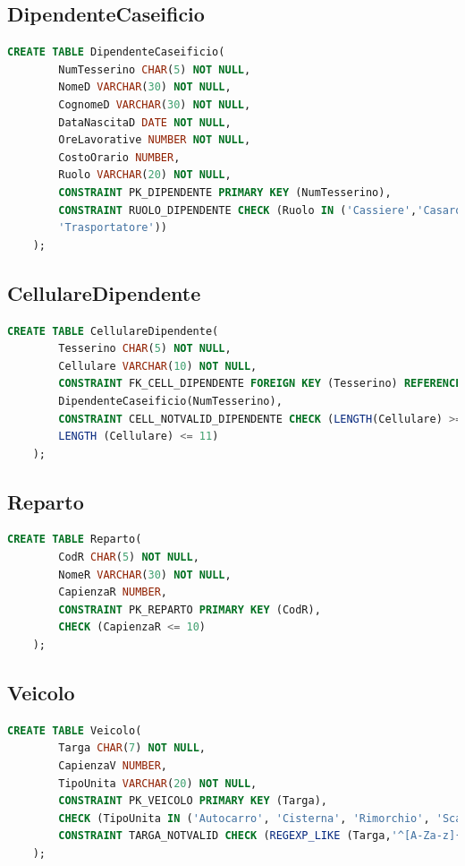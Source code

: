 \documentclass[12pt]{report}
\begin{document}
\subsection*{DipendenteCaseificio}
\begin{lstlisting}[language=SQL]
    CREATE TABLE DipendenteCaseificio(
        NumTesserino CHAR(5) NOT NULL,
        NomeD VARCHAR(30) NOT NULL,
        CognomeD VARCHAR(30) NOT NULL,
        DataNascitaD DATE NOT NULL,
        OreLavorative NUMBER NOT NULL,
        CostoOrario NUMBER,
        Ruolo VARCHAR(20) NOT NULL,
        CONSTRAINT PK_DIPENDENTE PRIMARY KEY (NumTesserino),
        CONSTRAINT RUOLO_DIPENDENTE CHECK (Ruolo IN ('Cassiere','Casaro','Addetto',
        'Trasportatore'))
    );
\end{lstlisting}

\subsection*{CellulareDipendente}
\begin{lstlisting}[language=SQL]
    CREATE TABLE CellulareDipendente(
        Tesserino CHAR(5) NOT NULL,
        Cellulare VARCHAR(10) NOT NULL,
        CONSTRAINT FK_CELL_DIPENDENTE FOREIGN KEY (Tesserino) REFERENCES 
        DipendenteCaseificio(NumTesserino),
        CONSTRAINT CELL_NOTVALID_DIPENDENTE CHECK (LENGTH(Cellulare) >= 9 AND 
        LENGTH (Cellulare) <= 11)
    );   
\end{lstlisting}

\newpage

\subsection*{Reparto}
\begin{lstlisting}[language=SQL]
    CREATE TABLE Reparto(
        CodR CHAR(5) NOT NULL,
        NomeR VARCHAR(30) NOT NULL,
        CapienzaR NUMBER,
        CONSTRAINT PK_REPARTO PRIMARY KEY (CodR),
        CHECK (CapienzaR <= 10)
    );
\end{lstlisting}

\subsection*{Veicolo}
\begin{lstlisting}[language=SQL]
    CREATE TABLE Veicolo(
        Targa CHAR(7) NOT NULL,
        CapienzaV NUMBER,
        TipoUnita VARCHAR(20) NOT NULL,
        CONSTRAINT PK_VEICOLO PRIMARY KEY (Targa),
        CHECK (TipoUnita IN ('Autocarro', 'Cisterna', 'Rimorchio', 'Scarrabile')),
        CONSTRAINT TARGA_NOTVALID CHECK (REGEXP_LIKE (Targa,'^[A-Za-z]{2}[0-9]{3}[A-Za-z]{2}$'))
    );
\end{lstlisting}
\end{document}
